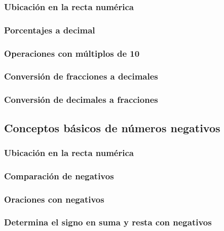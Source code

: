 \documentclass[12pt,addpoints,answers]{evalua}
\begin{document}
\begin{questions}
	\subsubsection{Ubicación en la recta numérica}
	\question[1]{}
	\subsubsection{Porcentajes a decimal}
	\question[1]{}
	\subsubsection{Operaciones con múltiplos de 10}
	\question[1]{}
	\subsubsection{Conversión de fracciones a decimales}
	\question[1]{}
	\subsubsection{Conversión de decimales a fracciones}
	\question[1]{}

	\subsection   {Conceptos básicos de números negativos}
	\subsubsection{Ubicación en la recta numérica}
	\question[1]{}
	\subsubsection{Comparación de negativos}
	\question[1]{}
	\subsubsection{Oraciones con negativos}
	\question[1]{}
	\subsubsection{Determina el signo en suma y resta con negativos}
	\question[1]{}

\end{questions}
\end{document}
